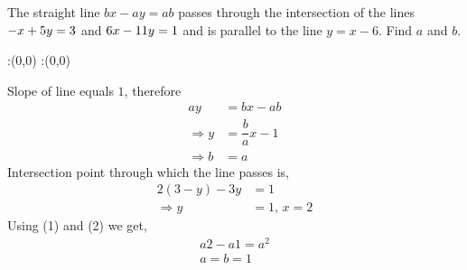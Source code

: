 \question[2] The straight line $bx-ay = ab$ passes through the intersection of the lines $- x +5 y =3$ and $6 x-11 y =1$ 
and is parallel to the line $y=x-6$. Find $a$ and $b$.


\watchout

\ifprintanswers
  \begin{marginfigure}
      :(0,0)
      :(0,0)
    \figdrawbegin{}
      \figdrawline [100,101]
    \figdrawend
    \figvisu{\figBoxA}{}{%
    }
    \centerline{\box\figBoxA}
  \end{marginfigure}
\fi 


\begin{solution}[\halfpage]
  Slope of line equals $1$, therefore
  \begin{align}
               ay &= bx-ab 				\nonumber \\
  	\Rightarrow y &= \dfrac{b}{a}x - 1  \nonumber \\
  	\Rightarrow b &= a
  \end{align}
  Intersection point through which the line passes is,
  \begin{align}  
    2(3-y) - 3y   &= 1 \nonumber \\    			
    \Rightarrow y &= 1\text{, }x = 2 
  \end{align}
  Using (1) and (2) we get,
  \begin{align}
    a2-a1=a^2 \nonumber \\
    a=b=1 \nonumber
  \end{align}
\end{solution}

